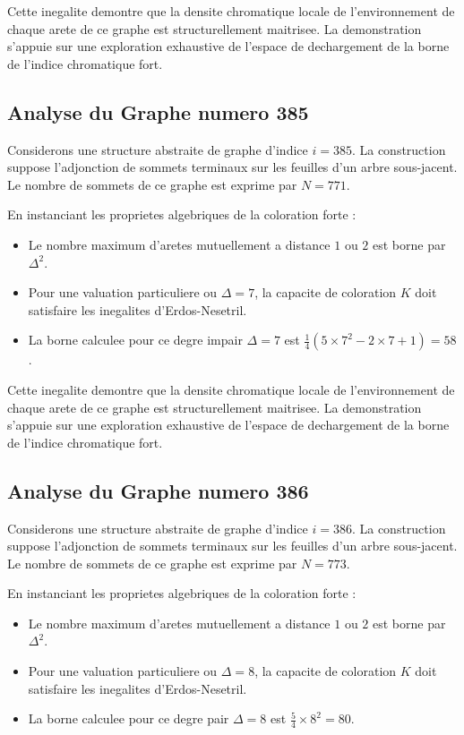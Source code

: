 \documentclass[11pt,a4paper]{article}
\begin{document}
Cette inegalite demontre que la densite chromatique locale de l'environnement de chaque arete de ce graphe est structurellement maitrisee. La demonstration s'appuie sur une exploration exhaustive de l'espace de dechargement de la borne de l'indice chromatique fort.

\subsection{Analyse du Graphe numero 385}
Considerons une structure abstraite de graphe d'indice $i = 385$. La construction suppose l'adjonction de sommets terminaux sur les feuilles d'un arbre sous-jacent. Le nombre de sommets de ce graphe est exprime par $N = 771$.

En instanciant les proprietes algebriques de la coloration forte :
\begin{itemize}
\item Le nombre maximum d'aretes mutuellement a distance $1$ ou $2$ est borne par $\Delta^2$.
\item Pour une valuation particuliere ou $\Delta = 7$, la capacite de coloration $K$ doit satisfaire les inegalites d'Erdos-Nesetril.
\item La borne calculee pour ce degre impair $\Delta = 7$ est $\frac{1}{4}(5 \times 7^2 - 2 \times 7 + 1) = 58$.
\end{itemize}

Cette inegalite demontre que la densite chromatique locale de l'environnement de chaque arete de ce graphe est structurellement maitrisee. La demonstration s'appuie sur une exploration exhaustive de l'espace de dechargement de la borne de l'indice chromatique fort.

\subsection{Analyse du Graphe numero 386}
Considerons une structure abstraite de graphe d'indice $i = 386$. La construction suppose l'adjonction de sommets terminaux sur les feuilles d'un arbre sous-jacent. Le nombre de sommets de ce graphe est exprime par $N = 773$.

En instanciant les proprietes algebriques de la coloration forte :
\begin{itemize}
\item Le nombre maximum d'aretes mutuellement a distance $1$ ou $2$ est borne par $\Delta^2$.
\item Pour une valuation particuliere ou $\Delta = 8$, la capacite de coloration $K$ doit satisfaire les inegalites d'Erdos-Nesetril.
\item La borne calculee pour ce degre pair $\Delta = 8$ est $\frac{5}{4} \times 8^2 = 80$.
\end{itemize}
\end{document}
